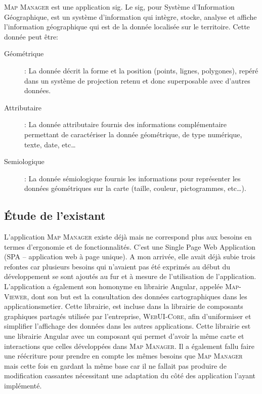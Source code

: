 \documentclass{rapportUHA40}
\begin{document}
\textsc{Map Manager} est une application \gls{sig}. Le \gls{sig}, pour Système d'Information Géographique, est un système d’information
qui intègre, stocke, analyse et affiche l'information géographique qui est de
la donnée localisée sur le territoire. Cette donnée peut être:
\begin{description}
  \item[Géométrique]: La donnée décrit la forme et la position (points, lignes,
  polygones), repéré dans un système de projection retenu et donc superposable
  avec d'autres données.
  \item[Attributaire]: La donnée attributaire fournis des informations complémentaire
  permettant de caractériser la donnée géométrique, de type numérique, texte,
  date, etc\ldots
  \item[Semiologique]: La donnée sémiologique fournis les informations pour représenter
  les données géométriques sur la carte (taille, couleur, pictogrammes,
  etc\ldots).
\end{description}

\subsection{Étude de l'existant}
L'application \textsc{Map Manager} existe déjà mais ne correspond plus aux
besoins en termes d'ergonomie et de fonctionnalités. C'est une Single Page Web
Application (SPA – application web à page unique). A mon arrivée, elle avait
déjà subie trois refontes car plusieurs besoins qui n'avaient pas été exprimés
au début du développement se sont ajoutés au fur et à mesure de l'utilisation
de l'application. \\

L'application a également son homonyme en librairie Angular, appelée
\textsc{Map-Viewer}, dont son but est la consultation des données
cartographiques dans les \gls{applicationsmetier}. Cette librairie, est incluse
dans la librairie de composants graphiques partagés utilisée par l'entreprise,
\textsc{WebUI-Core}, afin d'uniformiser et simplifier l'affichage des données
dans les autres applications. Cette librairie est une librairie Angular avec un
composant qui permet d'avoir la même carte et interactions que celles
développées dans \textsc{Map Manager}. Il a également fallu faire une
réécriture pour prendre en compte les mêmes besoins que \textsc{Map Manager}
mais cette fois en gardant la même base car il ne fallait pas produire de
modification cassantes nécessitant une adaptation du côté des application
l'ayant implémenté.
\end{document}
